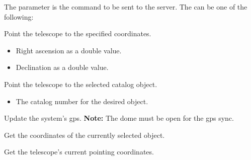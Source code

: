 \documentclass[a4paper,english]{article}
\begin{document}
The  parameter is the command to be sent to the server. The  can be one of the following:

\begin{Description}\setlength{\itemsep}{0cm}
\item[\Arg{goto}] Point the telescope to the specified coordinates.

	     
	
	\begin{itemize}
		\item {} Right ascension as a double value.
		\item {} Declination as a double value.
	\end{itemize}
	
\item[\Arg{messier}] Point the telescope to the selected catalog object.

\item[\Arg{star}]	    
	
\item[\Arg{deepsky}]	    
	
	    
	
	\begin{itemize}
		\item {} The catalog number for the desired object.
	\end{itemize}
	
\item[\Arg{gps}] Update the system's gps. \textbf{Note:} The dome must be open for the gps sync.

	   
	
\item[\Arg{getobjradec}] Get the coordinates of the currently selected object.

	   
	
\item[\Arg{gettelradec}] Get the telescope's current pointing coordinates.

	   
	

\end{Description}
\end{document}
